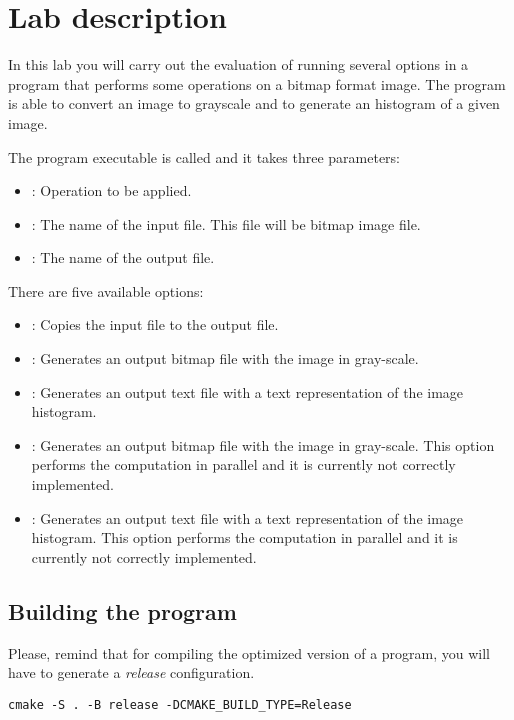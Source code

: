 \section{Lab description}

In this lab you will carry out the evaluation of running several
options in a program that performs some operations on a bitmap format image.
The program is able to convert an image to grayscale and to generate an
histogram of a given image.

The program executable is called  and it takes three parameters:
\begin{itemize}
\item {}: Operation to be applied.
\item {}: The name of the input file. This file will be bitmap image file.
\item {}: The name of the output file.
\end{itemize}

There are five available options:

\begin{itemize}
\item {}: Copies the input file to the output file.
\item {}: Generates an output bitmap file with the image in gray-scale.
\item {}: Generates an output text file with a text representation of the image histogram.
\item {}: Generates an output bitmap file with the image in gray-scale.
This option performs the computation in parallel and it is currently not correctly implemented.
\item {}: Generates an output text file with a text representation of the image histogram.
This option performs the computation in parallel and it is currently not correctly implemented.
\end{itemize}

\subsection{Building the program}

Please, remind that for compiling the optimized version of a program, 
you will have to generate a \emph{release} configuration.

\begin{lstlisting}[style=terminal,aboveskip=1em,belowskip=1em]
cmake -S . -B release -DCMAKE_BUILD_TYPE=Release
\end{lstlisting}


